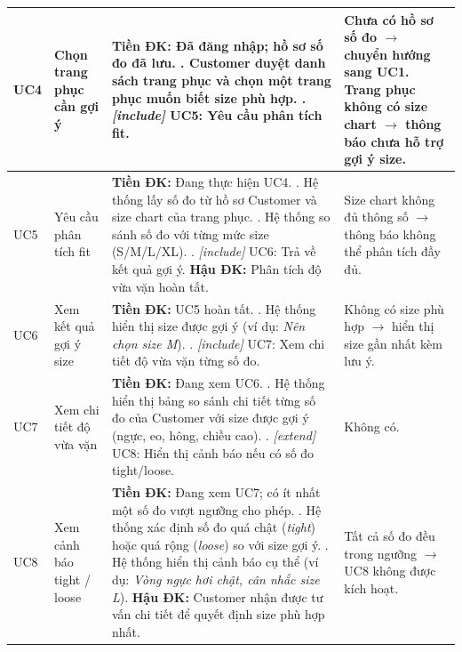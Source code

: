 \begin{longtable}{|>{\raggedright\arraybackslash}p{2cm}|>{\raggedright\arraybackslash}p{2.5cm}|>{\raggedright\arraybackslash}p{4cm}|>{\raggedright\arraybackslash}p{5.5cm}|}
UC4 & Chọn trang phục cần gợi ý &
  \textbf{Tiền ĐK:} Đã đăng nhập; hồ sơ số đo đã lưu. \newline
  1. Customer duyệt danh sách trang phục và chọn một trang phục muốn biết size phù hợp. \newline
  2. \textit{[include]} UC5: Yêu cầu phân tích fit. &
  Chưa có hồ sơ số đo $\to$ chuyển hướng sang UC1. \newline
  Trang phục không có size chart $\to$ thông báo chưa hỗ trợ gợi ý size. \\
\hline

UC5 & Yêu cầu phân tích fit &
  \textbf{Tiền ĐK:} Đang thực hiện UC4. \newline
  1. Hệ thống lấy số đo từ hồ sơ Customer và size chart của trang phục. \newline
  2. Hệ thống so sánh số đo với từng mức size (S/M/L/XL). \newline
  3. \textit{[include]} UC6: Trả về kết quả gợi ý. \newline
  \textbf{Hậu ĐK:} Phân tích độ vừa vặn hoàn tất. &
  Size chart không đủ thông số $\to$ thông báo không thể phân tích đầy đủ. \\
\hline

UC6 & Xem kết quả gợi ý size &
  \textbf{Tiền ĐK:} UC5 hoàn tất. \newline
  1. Hệ thống hiển thị size được gợi ý (ví dụ: \textit{Nên chọn size M}). \newline
  2. \textit{[include]} UC7: Xem chi tiết độ vừa vặn từng số đo. &
  Không có size phù hợp $\to$ hiển thị size gần nhất kèm lưu ý. \\
\hline

UC7 & Xem chi tiết độ vừa vặn &
  \textbf{Tiền ĐK:} Đang xem UC6. \newline
  1. Hệ thống hiển thị bảng so sánh chi tiết từng số đo của Customer với size được gợi ý (ngực, eo, hông, chiều cao). \newline
  2. \textit{[extend]} UC8: Hiển thị cảnh báo nếu có số đo tight/loose. &
  Không có. \\
\hline

UC8 & Xem cảnh báo tight / loose &
  \textbf{Tiền ĐK:} Đang xem UC7; có ít nhất một số đo vượt ngưỡng cho phép. \newline
  1. Hệ thống xác định số đo quá chật (\textit{tight}) hoặc quá rộng (\textit{loose}) so với size gợi ý. \newline
  2. Hệ thống hiển thị cảnh báo cụ thể (ví dụ: \textit{Vòng ngực hơi chật, cân nhắc size L}). \newline
  \textbf{Hậu ĐK:} Customer nhận được tư vấn chi tiết để quyết định size phù hợp nhất. &
  Tất cả số đo đều trong ngưỡng $\to$ UC8 không được kích hoạt. \\
\hline

\end{longtable}
